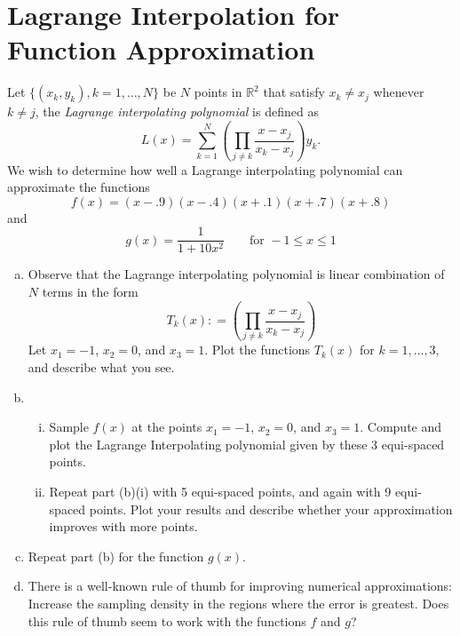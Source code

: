 
\section{Lagrange Interpolation for Function Approximation}
Let $\{(x_k,y_k) , k = 1, \dots, N\}$ be $N$ points in $\mathbb{R}^2$ that satisfy $x_k \neq x_j$ whenever $k \neq j$, the \textit{Lagrange interpolating polynomial} is defined as
\begin{equation}
L(x) = \sum_{k = 1}^N \left(\prod_{j \neq k}\frac{x-x_j}{x_k-x_j} \right) y_k.
\end{equation}
We wish to determine how well a Lagrange interpolating polynomial can approximate the functions 
\begin{equation}
f(x) = (x-.9)(x-.4)(x+.1)(x+.7)(x+.8)
\end{equation}
and 
\begin{equation}
g(x) = \frac{1}{1+10x^2} \quad \quad \text{for } -1 \leq x \leq 1
\end{equation}
\begin{enumerate}[(a)]
    \item Observe that the Lagrange interpolating polynomial is linear combination of $N$ terms in the form
    \begin{equation}
    T_k(x): =\left( \prod_{j \neq k}\frac{x-x_j}{x_k-x_j}  \right) 
    \end{equation}
    Let $x_1= -1$, $x_2 = 0$, and $x_3 = 1$. Plot the functions $T_k(x)$ for $k = 1,\dots,3$, and describe what you see.
    \item 
    \begin{enumerate}[i.]
      \item Sample $f(x)$ at the points $x_1 = -1$, $x_2 = 0$, and $x_3= 1$. Compute and plot the Lagrange Interpolating polynomial given by these 3 equi-spaced points.
      \item Repeat part (b)(i) with 5 equi-spaced points, and again with 9 equi-spaced points. Plot your results and describe whether your approximation improves with more points. 
    \end{enumerate}
    \item Repeat part (b) for the function $g(x)$.
    \item There is a well-known rule of thumb for improving numerical approximations: Increase the sampling density in the regions where the error is greatest. Does this rule of thumb seem to work with the functions $f$ and $g$?
\end{enumerate}

